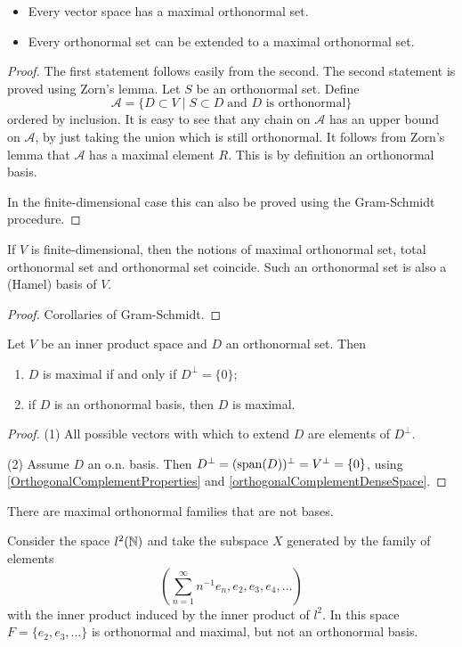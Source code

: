 \begin{proposition} \label{exitenceMaximalOrthonormalSet}
\begin{itemize}
\item Every vector space has a maximal orthonormal set.
\item Every orthonormal set can be extended to a maximal orthonormal set.
\end{itemize}
\end{proposition}
\begin{proof}
The first statement follows easily from the second. The second statement is proved using Zorn's lemma. Let $S$ be an orthonormal set. Define
\[ \mathcal{A} = \{ D\subset V \;|\; S\subset D \; \text{and $D$ is orthonormal} \} \]
ordered by inclusion. It is easy to see that any chain on $\mathcal{A}$ has an upper bound on $\mathcal{A}$, by just taking the union which is still orthonormal. It follows from Zorn's lemma that $\mathcal{A}$ has a maximal element $R$. This is by definition an orthonormal basis.

In the finite-dimensional case this can also be proved using the Gram-Schmidt procedure.
\end{proof}

\begin{proposition}
If $V$ is finite-dimensional, then the notions of maximal orthonormal set, total orthonormal set and orthonormal set coincide. Such an orthonormal set is also a (Hamel) basis of $V$.
\end{proposition}
\begin{proof}
Corollaries of Gram-Schmidt.
\end{proof}

\begin{lemma} \label{characterisationMaximalOrthonormalSet}
Let $V$ be an inner product space and $D$ an orthonormal set. Then
\begin{enumerate}
\item $D$ is maximal \textup{if and only if} $D^\perp = \{0\}$;
\item if $D$ is an orthonormal basis, then $D$ is maximal.
\end{enumerate}
\end{lemma}
\begin{proof}
(1) All possible vectors with which to extend $D$ are elements of $D^\perp$. 

(2) Assume $D$ an o.n. basis. Then $D^\perp = (\operatorname{span}(D))^\perp = V^\perp = \{0\}$, using \ref{OrthogonalComplementProperties} and \ref{orthogonalComplementDenseSpace}.
\end{proof}
There are maximal orthonormal families that are not bases.
\begin{example}
Consider the space $l^2(\mathbb{N})$ and take the subspace $X$ generated by the family of elements
\[ \left( \sum_{n=1}^\infty n^{-1}e_n, e_2,e_3,e_4,\ldots \right) \]
with the inner product induced by the inner product of $l^2$. In this space $F=\{e_2,e_3,\ldots\}$ is orthonormal and maximal, but not an orthonormal basis.
\end{example}

